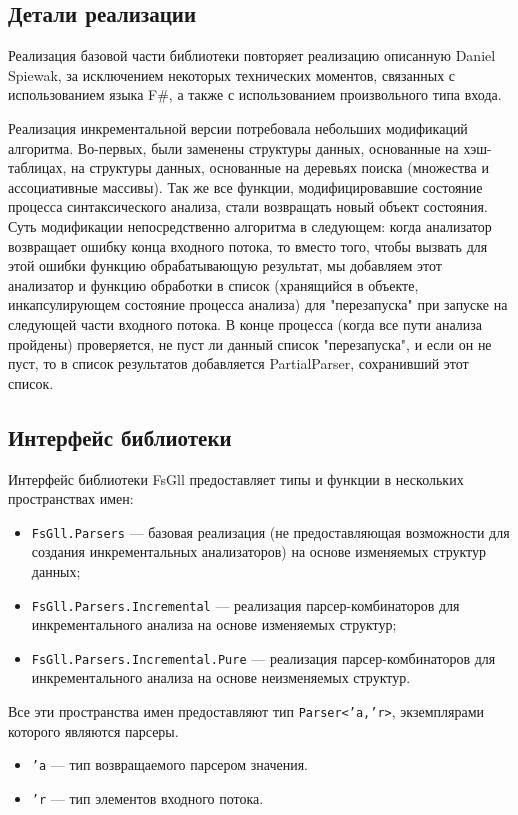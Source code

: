 \documentclass[14pt]{matmex-diploma}
\begin{document}
\subsection{Детали реализации}
Реализация базовой части библиотеки повторяет реализацию описанную Daniel Spiewak,
за исключением некоторых технических моментов, связанных с использованием языка F\#, 
а также с использованием произвольного типа входа. 

Реализация инкрементальной версии потребовала небольших модификаций алгоритма. 
Во-первых, были заменены структуры данных, основанные на хэш-таблицах, на структуры данных,
основанные на деревьях поиска
(множества и ассоциативные массивы). Так же все функции, модифицировавшие состояние процесса синтаксического анализа, 
стали возвращать новый объект состояния. Суть модификации непосредственно алгоритма в следующем: 
когда анализатор возвращает ошибку конца входного потока, то
вместо того, чтобы вызвать для этой ошибки функцию обрабатывающую результат, мы добавляем 
этот анализатор и функцию обработки в список (хранящийся в объекте, 
инкапсулирующем состояние процесса анализа) для "перезапуска" при запуске на следующей части входного потока. 
В конце процесса (когда все пути анализа пройдены) проверяется, не пуст ли данный список 
"перезапуска", и если он не пуст, то в список результатов 
добавляется PartialParser, сохранивший этот список.



\subsection{Интерфейс библиотеки}
Интерфейс библиотеки FsGll предоставляет типы и функции в нескольких пространствах имен:
\begin{itemize}
    \item {\tt FsGll.Parsers} --- базовая реализация 
    (не предоставляющая возможности для создания инкрементальных анализаторов) на основе изменяемых структур данных;
    \item {\tt FsGll.Parsers.Incremental} --- реализация парсер-комбинаторов для 
          инкрементального анализа на основе изменяемых структур;
    \item {\tt FsGll.Parsers.Incremental.Pure} --- реализация парсер-комбинаторов для 
          инкрементального анализа на основе неизменяемых структур.
\end{itemize}

Все эти пространства имен предоставляют тип {\tt Parser<'a,'r>}, экземплярами которого являются парсеры.
\begin{itemize}
    \item {\tt 'a} --- тип возвращаемого парсером значения.
    \item {\tt 'r} --- тип элементов входного потока.
\end{itemize}
\end{document}
